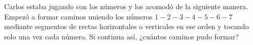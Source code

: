 Carlos estaba jugando con los números y los acomodó de la siguiente manera. Empezó a formar caminos uniendo los números $1-2-3-4-5-6-7$ mediante segmentos de rectas horizontales o verticales en ese orden y tocando solo una vez cada número. Si continua así, ¿cuántos caminos pudo formar?